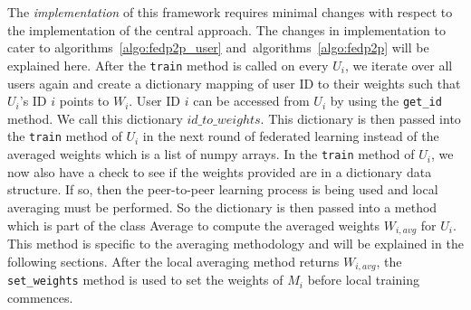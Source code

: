 \documentclass[12pt]{article}
\begin{document}
\\\\
The \textit{implementation} of this framework requires minimal changes with respect to the implementation of the central approach. The changes in implementation to cater to algorithms~\ref{algo:fedp2p_user} and~algorithms~\ref{algo:fedp2p} will be explained here. After the \texttt{train} method is called on every $U_i$, we iterate over all users again and create a dictionary mapping of user ID to their weights such that $U_i$'s ID $i$ points to $W_i$. User ID $i$ can be accessed from $U_i$ by using the \texttt{get\_id} method. We call this dictionary $id\_to\_weights$. This dictionary is then passed into the \texttt{train} method of $U_i$ in the next round of federated learning instead of the averaged weights which is a list of numpy arrays. In the \texttt{train} method of $U_i$, we now also have a check to see if the weights provided are in a dictionary data structure. If so, then the peer-to-peer learning process is being used and local averaging must be performed. So the dictionary is then passed into a method which is part of the class Average to compute the averaged weights $W_{i,avg}$ for $U_i$. This method is specific to the averaging methodology and will be explained in the following sections. After the local averaging method returns $W_{i,avg}$, the \texttt{set\_weights} method is used to set the weights of $M_i$ before local training commences. 
\end{document}
